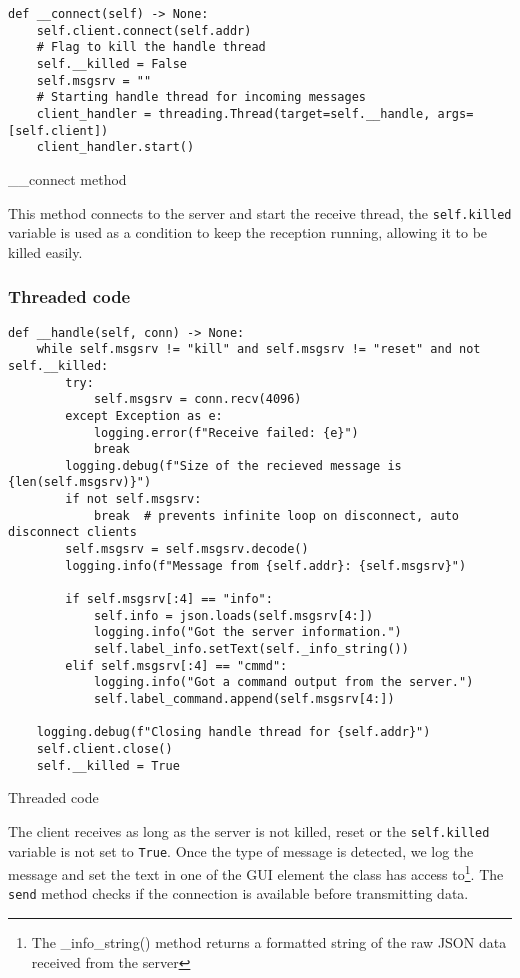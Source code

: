 \documentclass{article}
\begin{document}
\begin{listing}[H]
    \begin{verbatim}
def __connect(self) -> None:
    self.client.connect(self.addr)
    # Flag to kill the handle thread
    self.__killed = False
    self.msgsrv = ""
    # Starting handle thread for incoming messages
    client_handler = threading.Thread(target=self.__handle, args=[self.client])
    client_handler.start()
    \end{verbatim}
    \caption{\_\_connect method}
    \label{client:connect}
\end{listing}

This method connects to the server and start the receive thread, the
\verb|self.killed| variable is used as a condition to keep the reception
running, allowing it to be killed easily.

\subsubsection{Threaded code}
\begin{listing}[H]
    \begin{verbatim}
def __handle(self, conn) -> None:
    while self.msgsrv != "kill" and self.msgsrv != "reset" and not self.__killed:
        try:
            self.msgsrv = conn.recv(4096)
        except Exception as e:
            logging.error(f"Receive failed: {e}")
            break
        logging.debug(f"Size of the recieved message is {len(self.msgsrv)}")
        if not self.msgsrv:
            break  # prevents infinite loop on disconnect, auto disconnect clients
        self.msgsrv = self.msgsrv.decode()
        logging.info(f"Message from {self.addr}: {self.msgsrv}")

        if self.msgsrv[:4] == "info":
            self.info = json.loads(self.msgsrv[4:])
            logging.info("Got the server information.")
            self.label_info.setText(self._info_string())
        elif self.msgsrv[:4] == "cmmd":
            logging.info("Got a command output from the server.")
            self.label_command.append(self.msgsrv[4:])

    logging.debug(f"Closing handle thread for {self.addr}")
    self.client.close()
    self.__killed = True
    \end{verbatim}
    \caption{Threaded code}
    \label{client:thread}
\end{listing}

The client receives as long as the server is not killed, reset or the
\verb|self.killed| variable is not set to \verb|True|. Once the type of message
is detected, we log the message and set the text in one of the GUI element the
class has access to\footnote{The \_info\_string() method returns a formatted
string of the raw JSON data received from the server}. The \verb|send| method
checks if the connection is available before transmitting data.
\end{document}
